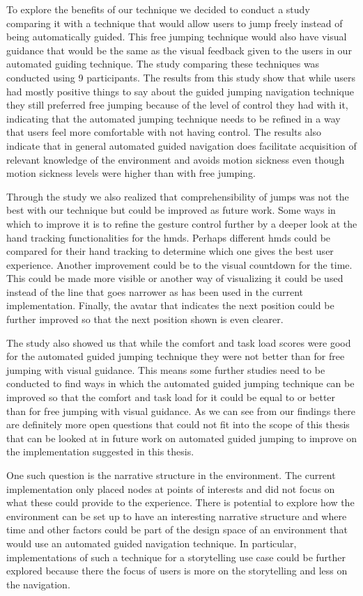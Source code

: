 To explore the benefits of our technique we decided to conduct a study comparing it with a technique that would allow users to jump freely instead of being automatically guided. This free jumping technique would also have visual guidance that would be the same as the visual feedback given to the users in our automated guiding technique. The study comparing these techniques was conducted using 9 participants. The results from this study show that while users had mostly positive things to say about the guided jumping navigation technique they still preferred free jumping because of the level of control they had with it, indicating that the automated jumping technique needs to be refined in a way that users feel more comfortable with not having control. The results also indicate that in general automated guided navigation does facilitate acquisition of relevant knowledge of the environment and avoids motion sickness even though motion sickness levels were higher than with free jumping. 

Through the study we also realized that comprehensibility of jumps was not the best with our technique but could be improved as future work. Some ways in which to improve it is to refine the gesture control further by a deeper look at the hand tracking functionalities for the \acrshort{hmd}s. Perhaps different \acrshort{hmd}s could be compared for their hand tracking to determine which one gives the best user experience. Another improvement could be to the visual countdown for the time. This could be made more visible or another way of visualizing it could be used instead of the line that goes narrower as has been used in the current implementation. Finally, the avatar that indicates the next position could be further improved so that the next position shown is even clearer. 

The study also showed us that while the comfort and task load scores were good for the automated guided jumping technique they were not better than for free jumping with visual guidance. This means some further studies need to be conducted to find ways in which the automated guided jumping technique can be improved so that the comfort and task load for it could be equal to or better than for free jumping with visual guidance.  As we can see from our findings there are definitely more open questions that could not fit into the scope of this thesis that can be looked at in future work on automated guided jumping to improve on the implementation suggested in this thesis.

One such question is the narrative structure in the environment. The current implementation only placed nodes at points of interests and did not focus on what these could provide to the experience. There is potential to explore how the environment can be set up to have an interesting narrative structure and where time and other factors could be part of the design space of an environment that would use an automated guided navigation technique. In particular, implementations of such a technique for a storytelling use case could be further explored because there the focus of users is more on the storytelling and less on the navigation.

